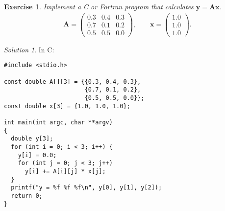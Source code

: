 \documentclass[onecolumn, oneside, a4paper, 11pt]{memoir}
\newtheorem{ex}{Exercise}
\theoremstyle{remark}
\newtheorem*{sol}{Solution}
\begin{document}
\begin{ex}
  Implement a C or Fortran program that calculates $\bm y = \bm A \bm x$.
  \begin{align*}
    \bm A =
    \begin{pmatrix}
      0.3 & 0.4 & 0.3 \\
      0.7 & 0.1 & 0.2 \\
      0.5 & 0.5 & 0.0
    \end{pmatrix}, \qquad \bm x = \begin{pmatrix} 1.0 \\ 1.0 \\ 1.0 \end{pmatrix}.
  \end{align*}
\end{ex}
\newpage
\begin{sol}
  In C:

  \begin{lstlisting}[style=c]
#include <stdio.h>

const double A[][3] = {{0.3, 0.4, 0.3},
                       {0.7, 0.1, 0.2},
                       {0.5, 0.5, 0.0}};
const double x[3] = {1.0, 1.0, 1.0};

int main(int argc, char **argv)
{
  double y[3];
  for (int i = 0; i < 3; i++) {
    y[i] = 0.0;
    for (int j = 0; j < 3; j++)
      y[i] += A[i][j] * x[j];
  }
  printf("y = %f %f %f\n", y[0], y[1], y[2]);
  return 0;
}
  \end{lstlisting}
\end{sol}
\end{document}

